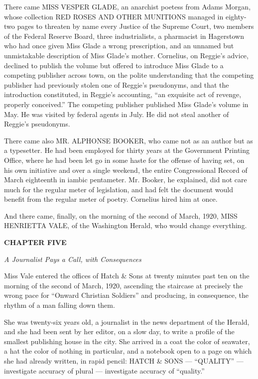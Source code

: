 \documentclass[12pt,openright]{book}
\begin{document}
There came MISS VESPER GLADE, an anarchist poetess from Adams Morgan, whose collection RED ROSES AND OTHER MUNITIONS managed in eighty-two pages to threaten by name every Justice of the Supreme Court, two members of the Federal Reserve Board, three industrialists, a pharmacist in Hagerstown who had once given Miss Glade a wrong prescription, and an unnamed but unmistakable description of Miss Glade’s mother. Cornelius, on Reggie’s advice, declined to publish the volume but offered to introduce Miss Glade to a competing publisher across town, on the polite understanding that the competing publisher had previously stolen one of Reggie’s pseudonyms, and that the introduction constituted, in Reggie’s accounting, “an exquisite act of revenge, properly conceived.” The competing publisher published Miss Glade’s volume in May. He was visited by federal agents in July. He did not steal another of Reggie’s pseudonyms.

There came also MR. ALPHONSE BOOKER, who came not as an author but as a typesetter. He had been employed for thirty years at the Government Printing Office, where he had been let go in some haste for the offense of having set, on his own initiative and over a single weekend, the entire Congressional Record of March eighteenth in iambic pentameter. Mr. Booker, he explained, did not care much for the regular meter of legislation, and had felt the document would benefit from the regular meter of poetry. Cornelius hired him at once.

And there came, finally, on the morning of the second of March, 1920, MISS HENRIETTA VALE, of the Washington Herald, who would change everything.

\textbf{CHAPTER FIVE}

\textit{A Journalist Pays a Call, with Consequences}

Miss Vale entered the offices of Hatch \& Sons at twenty minutes past ten on the morning of the second of March, 1920, ascending the staircase at precisely the wrong pace for “Onward Christian Soldiers” and producing, in consequence, the rhythm of a man falling down them.

She was twenty-six years old, a journalist in the news department of the Herald, and she had been sent by her editor, on a slow day, to write a profile of the smallest publishing house in the city. She arrived in a coat the color of seawater, a hat the color of nothing in particular, and a notebook open to a page on which she had already written, in rapid pencil: HATCH \& SONS — “QUALITY” — investigate accuracy of plural — investigate accuracy of “quality.”
\end{document}
